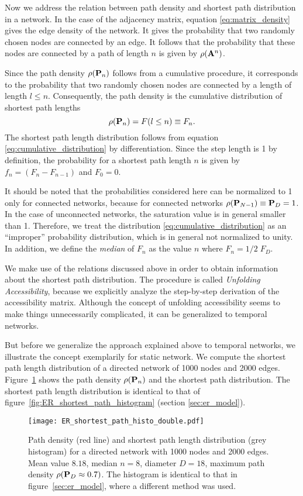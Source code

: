 Now we address the relation between path density and shortest path distribution in a network.
In the case of the adjacency matrix, equation \eqref{eq:matrix_density} gives the edge density of the network.
It gives the probability that two randomly chosen nodes are connected by an edge.
It follows that the probability that these nodes are connected by a path of length $n$ is given by $\rho (\mathbf{A}^n)$.

Since the path density $\rho (\mathbf{P}_n)$ follows from a cumulative procedure, it corresponds to the probability that two randomly chosen nodes are connected by a length of length $l\leq n$.
Consequently, the path density is the cumulative distribution of shortest path lengths
\begin{equation}\label{eq:cumulative_distribution}
\rho (\mathbf{P}_n)=F(l\leq n)\equiv F_n .
\end{equation}
The shortest path length distribution follows from equation \eqref{eq:cumulative_distribution} by differentiation.
Since the step length is 1 by definition, the probability for a shortest path length $n$ is given by $f_n=(F_n-F_{n-1})$ and $F_0=0$.

It should be noted that the probabilities considered here can be normalized to 1 only for connected networks, because for connected networks $\rho (\mathbf{P}_{N-1})\equiv \mathbf{P}_D=1$.
In the case of unconnected networks, the saturation value is in general smaller than 1.
Therefore,  we treat the distribution \eqref{eq:cumulative_distribution} as an ``improper'' probability distribution, which is in general not normalized to unity.
In addition, we define the \emph{median} of $F_n$ as the value $n$ where $F_n=1/2 \; F_D$.

We make use of the relations discussed above in order to obtain information about the shortest path distribution.
The procedure is called \emph{Unfolding Accessibility}, because we explicitly analyze the step-by-step derivation of the accessibility matrix.
Although the concept of unfolding accessibility seems to make things unnecessarily complicated, it can be generalized to temporal networks.

But before we generalize the approach explained above to temporal networks, we illustrate the concept exemplarily for static \ER network.
We compute the shortest path length distribution of a directed \ER network of 1000 nodes and 2000 edges.
Figure~\ref{fig:er_histo} shows the path density $\rho (\mathbf{P}_n)$ and the shortest path distribution.
The shortest path length distribution is identical to that of figure~\ref{fig:ER_shortest_path_histogram} (section \ref{sec:er_model}).
%
\begin{figure}[htbp]
\begin{center}
\texttt{[image: ER\_shortest\_path\_histo\_double.pdf]}
\caption{Path density (red line) and shortest path length distribution (grey histogram) for a directed \ER network with 1000 nodes and 2000 edges.
Mean value $8.18$, median $n=8$, diameter $D=18$, maximum path density $\rho (\mathbf{P}_D\approx 0.7)$.
The histogram is identical to that in figure~\ref{sec:er_model}, where a different method was used.
}
\label{fig:er_histo}
\end{center}
\end{figure}
%


